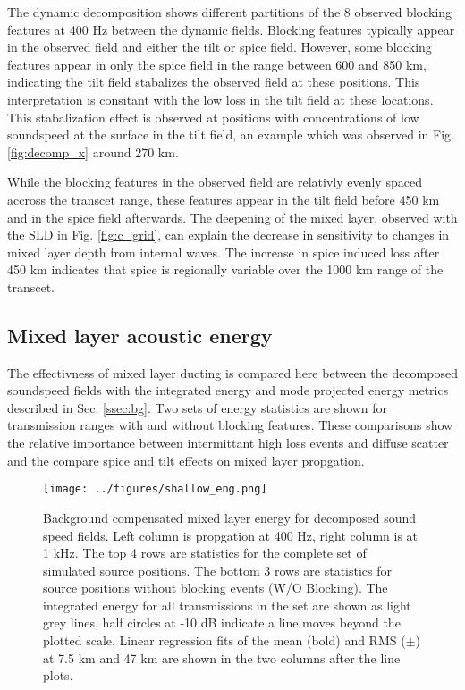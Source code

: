 \documentclass[preprint,NumberedRefs]{JASA}
\begin{document}
The dynamic decomposition shows different partitions of the 8 observed blocking features at 400 Hz between the dynamic fields. Blocking features typically appear in the observed field and either the tilt or spice field. However, some blocking features appear in only the spice field in the range between 600 and 850 km, indicating the tilt field stabalizes the observed field at these positions. This interpretation is consitant with the low loss in the tilt field at these locations. This stabalization effect is observed at positions with concentrations of low soundspeed at the surface in the tilt field, an example which was observed in Fig. \ref{fig:decomp_x} around 270 km.

While the blocking features in the observed field are relativly evenly spaced accross the transcet range, these features appear in the tilt field before 450 km and in the spice field afterwards. The deepening of the mixed layer, observed with the SLD in Fig. \ref{fig:c_grid}, can explain the decrease in sensitivity to changes in mixed layer depth from internal waves. The increase in spice induced loss after 450 km indicates that spice is regionally variable over the 1000 km range of the transcet.

\subsection{Mixed layer acoustic energy}
The effectivness of mixed layer ducting is compared here between the decomposed soundspeed fields with the integrated energy and mode projected energy metrics described in Sec. \ref{ssec:bg}. Two sets of energy statistics are shown for transmission ranges with and without blocking features. These comparisons show the relative importance between intermittant high loss events and diffuse scatter and the compare spice and tilt effects on mixed layer propgation.

\begin{figure}
\texttt{[image: ../figures/shallow\_eng.png]}
    \caption{Background compensated mixed layer energy for decomposed sound speed fields. Left column is propgation at 400 Hz, right column is at 1 kHz. The top 4 rows are statistics for the complete set of simulated source positions. The bottom 3 rows are statistics for source positions without blocking events (W/O Blocking). The integrated energy for all transmissions in the set are shown as light grey lines, half circles at -10 dB indicate a line moves beyond the plotted scale. Linear regression fits of the mean (bold) and RMS ($\pm$) at 7.5 km and 47 km are shown in the two columns after the line plots.}
    \label{fig:shal_eng}
\end{figure}
\end{document}
